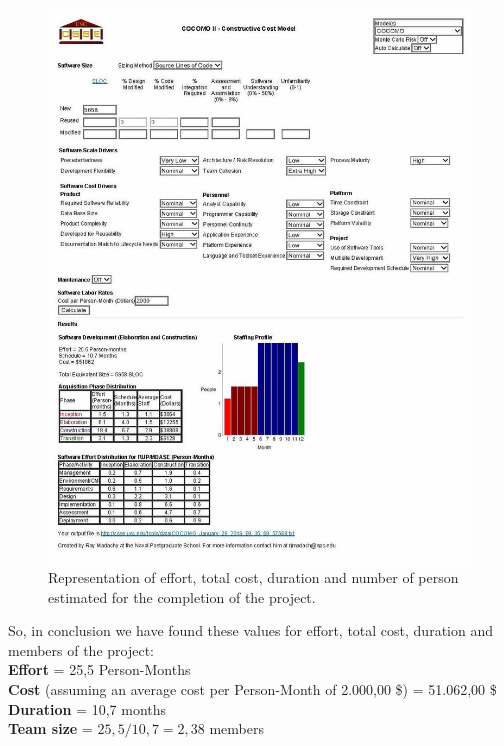\begin{figure}[!htbp]
\centering
\includegraphics[width=\textwidth]{cpt/img/COCOMOII-ConstructiveCostModel}
\caption{Representation of effort, total cost, duration and number of person estimated for the completion of the project.}
\end{figure}

\noindent So, in conclusion we have found these values for effort, total cost, duration and members of the project:\\
\textbf{Effort} = 25,5 Person-Months \\
\textbf{Cost} (assuming an average cost per Person-Month of 2.000,00 \$) = 51.062,00 \$ \\
\textbf{Duration} = 10,7 months \\
\textbf{Team size} = $25,5 / 10,7 = 2,38$ members \\